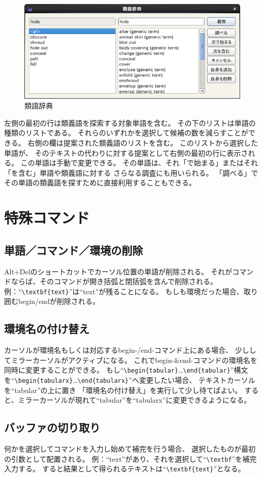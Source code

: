 \begin{figure}[H]
  \centering
  \includegraphics[width=.8\linewidth]{thesaurus.png}
  \caption{類語辞典}
\end{figure}

左側の最初の行は類義語を探索する対象単語を含む。
その下のリストは単語の種類のリストである。
それらのいずれかを選択して候補の数を減らすことができる。
右側の欄は提案された類義語のリストを含む。
このリストから選択した単語が、
そのテキストの代わりに対する提案として右側の最初の行に表示される。
この単語は手動で変更できる。
その単語は、それ「で始まる」またはそれ「を含む」単語や類義語に対する
さらなる調査にも用いられる。
「調べる」でその単語の類義語を探すために直接利用することもできる。

\section{特殊コマンド}

\subsection{単語／コマンド／環境の削除}

Alt+Delのショートカットでカーソル位置の単語が削除される。
それがコマンドならば、そのコマンドが開き括弧と閉括弧を含んで削除される。
例：``\verb+\textbf{text}+''は``text''が残ることになる。
もしも環境だった場合、取り囲むbegin/endが削除される。

\subsection{環境名の付け替え}

カーソルが環境名もしくは対応するbegin-/end-コマンド上にある場合、
少ししてミラーカーソルがアクティブになる。
これでbegin-\&end-コマンドの環境名を同時に変更することができる。
もし``\verb+\begin{tabular}+\ldots{}\verb+\end{tabular}+''構文
を``\verb+\begin{tabularx}+\ldots{}\verb+\end{tabularx}+''へ変更したい場合、
テキストカーソルを``tabular''の上に置き
「環境名の付け替え」を実行して少し待てばよい。
すると、ミラーカーソルが現れて``tabular''を``tabularx''に変更できるようになる。

\subsection{バッファの切り取り}

何かを選択してコマンドを入力し始めて補完を行う場合、
選択したものが最初の引数として配置される。
例：``text''があり、それを選択して``\verb+\textbf+''を補完入力する。
すると結果として得られるテキストは``\verb+\textbf{text}+''となる。

